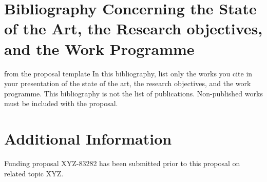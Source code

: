 \documentclass[RAM,gitinfo\classoptions]{dfgproposal}
\begin{document}
\begin{proposal}



\section{Bibliography Concerning the State of the Art, the Research objectives, and the
  Work Programme}\label{sec:bib}

\begin{todo}{from the proposal template}
In this bibliography, list only the works you cite in your presentation of the state of the
art, the research objectives, and the work programme. This bibliography is not the list
of publications. Non-published works must be included with the proposal.
\end{todo}
\printbibliography[heading=empty,notcategory=featured]



\section{Additional Information}\label{sec:additional}

Funding proposal XYZ-83282 has been submitted prior to this proposal on related topic XYZ.
\end{proposal}
\end{document}
